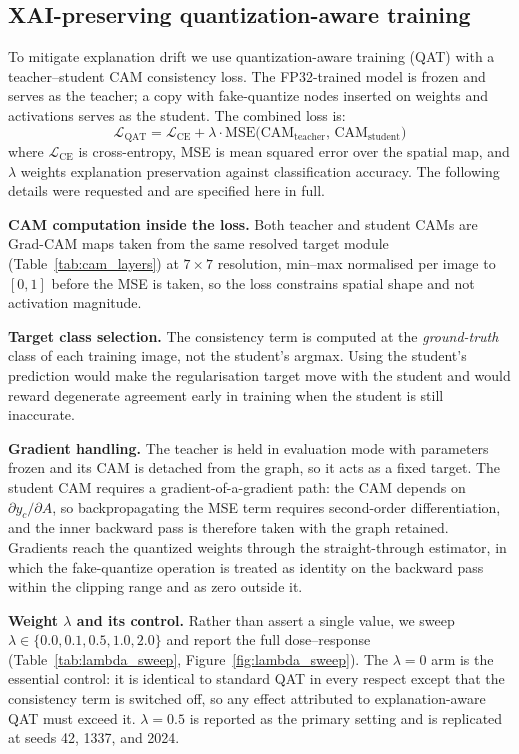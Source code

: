 \documentclass[fleqn,10pt]{wlscirep}
\begin{document}
\subsection*{XAI-preserving quantization-aware training}

To mitigate explanation drift we use quantization-aware training (QAT) with a teacher--student CAM consistency loss. The FP32-trained model is frozen and serves as the teacher; a copy with fake-quantize nodes inserted on weights and activations serves as the student. The combined loss is:
\begin{equation}
\mathcal{L}_{\text{QAT}} = \mathcal{L}_{\text{CE}} + \lambda \cdot \text{MSE}\bigl(\text{CAM}_{\text{teacher}},\, \text{CAM}_{\text{student}}\bigr)
\label{eq:qat}
\end{equation}
where $\mathcal{L}_{\text{CE}}$ is cross-entropy, MSE is mean squared error over the spatial map, and $\lambda$ weights explanation preservation against classification accuracy. The following details were requested and are specified here in full.

\textbf{CAM computation inside the loss.} Both teacher and student CAMs are Grad-CAM maps taken from the same resolved target module (Table~\ref{tab:cam_layers}) at $7 \times 7$ resolution, min--max normalised per image to $[0,1]$ before the MSE is taken, so the loss constrains spatial shape and not activation magnitude.

\textbf{Target class selection.} The consistency term is computed at the \emph{ground-truth} class of each training image, not the student's argmax. Using the student's prediction would make the regularisation target move with the student and would reward degenerate agreement early in training when the student is still inaccurate.

\textbf{Gradient handling.} The teacher is held in evaluation mode with parameters frozen and its CAM is detached from the graph, so it acts as a fixed target. The student CAM requires a gradient-of-a-gradient path: the CAM depends on $\partial y_c / \partial A$, so backpropagating the MSE term requires second-order differentiation, and the inner backward pass is therefore taken with the graph retained. Gradients reach the quantized weights through the straight-through estimator, in which the fake-quantize operation is treated as identity on the backward pass within the clipping range and as zero outside it.

\textbf{Weight $\lambda$ and its control.} Rather than assert a single value, we sweep $\lambda \in \{0.0, 0.1, 0.5, 1.0, 2.0\}$ and report the full dose--response (Table~\ref{tab:lambda_sweep}, Figure~\ref{fig:lambda_sweep}). The $\lambda = 0$ arm is the essential control: it is identical to standard QAT in every respect except that the consistency term is switched off, so any effect attributed to explanation-aware QAT must exceed it. $\lambda = 0.5$ is reported as the primary setting and is replicated at seeds 42, 1337, and 2024.
\end{document}

